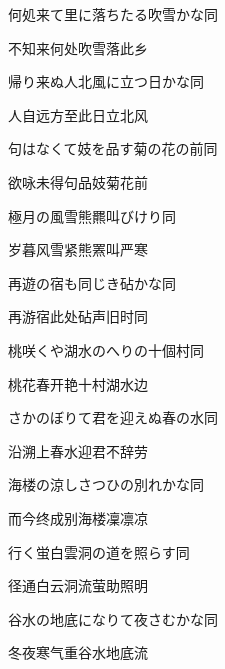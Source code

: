 \begin{haiku}
    {\FH 何処来て里に落ちたる吹雪かな}\hfill{\FH 同}

    {\FK 不知来何处吹雪落此乡}
\end{haiku}

\begin{haiku}
    {\FH 帰り来ぬ人北風に立つ日かな}\hfill{\FH 同}

    {\FK 人自远方至此日立北风}
\end{haiku}

\begin{haiku}
    {\FH 句はなくて妓を品す菊の花の前}\hfill{\FH 同}

    {\FK 欲咏未得句品妓菊花前}
\end{haiku}

\begin{haiku}
    {\FH 極月の風雪熊羆叫びけり}\hfill{\FH 同}

    {\FK 岁暮风雪紧熊罴叫严寒}
\end{haiku}

\begin{haiku}
    {\FH 再遊の宿も同じき砧かな}\hfill{\FH 同}

    {\FK 再游宿此处砧声旧时同}
\end{haiku}

\begin{haiku}
    {\FH 桃咲くや湖水のへりの十個村}\hfill{\FH 同}

    {\FK 桃花春开艳十村湖水边}
\end{haiku}

\begin{haiku}
    {\FH さかのぼりて君を迎えぬ春の水}\hfill{\FH 同}

    {\FK 沿溯上春水迎君不辞劳}
\end{haiku}

\begin{haiku}
    {\FH 海楼の涼しさつひの別れかな}\hfill{\FH 同}

    {\FK 而今终成别海楼凜凛凉}
\end{haiku}

\begin{haiku}
    {\FH 行く蛍白雲洞の道を照らす}\hfill{\FH 同}

    {\FK 径通白云洞流萤助照明}
\end{haiku}

\begin{haiku}
    {\FH 谷水の地底になりて夜さむかな}\hfill{\FH 同}

    {\FK 冬夜寒气重谷水地底流}
\end{haiku}


